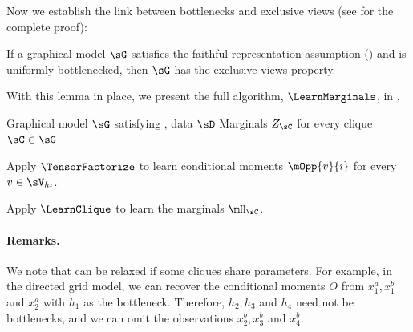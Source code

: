 Now we establish the link between bottlenecks and exclusive views
(see  for the complete proof):
\begin{lemma}
  \label{lem:bottleneck-views}  
  If a graphical model $\sG$ satisfies the faithful representation 
  assumption () and is uniformly bottlenecked, then
  $\sG$ has the exclusive views property.
\end{lemma}

With this lemma in place, we present the full algorithm, $\LearnMarginals$,
in .

\begin{algorithm}
  \caption{\LearnMarginals}
  \label{algo:directed}
  \begin{algorithmic}
    \REQUIRE Graphical model $\sG$ satisfying , data $\sD$
    \ENSURE Marginals $Z_\sC$ for every clique $\sC \in \sG$

        \STATE Apply $\TensorFactorize$ to learn conditional moments
        $\mOpp{v}{i}$ for every $v \in \sV_{h_i}$.

      \ENDFOR
\STATE Apply $\LearnClique$ to learn the marginals $\mH_\sC$.
\ENDFOR
  \end{algorithmic}
\end{algorithm}



\paragraph{Remarks.} We note that  can be relaxed if some cliques
  share parameters.
For example, in the directed grid model, we can recover the conditional moments $O$ from
  $x^a_1, x^b_1$ and $x^a_2$ with $h_1$ as the bottleneck.
  Therefore, $h_2, h_3$ and $h_4$
  need not be bottlenecks, and we can omit the observations $x^b_2, x^b_3$ and $x^b_4$.

